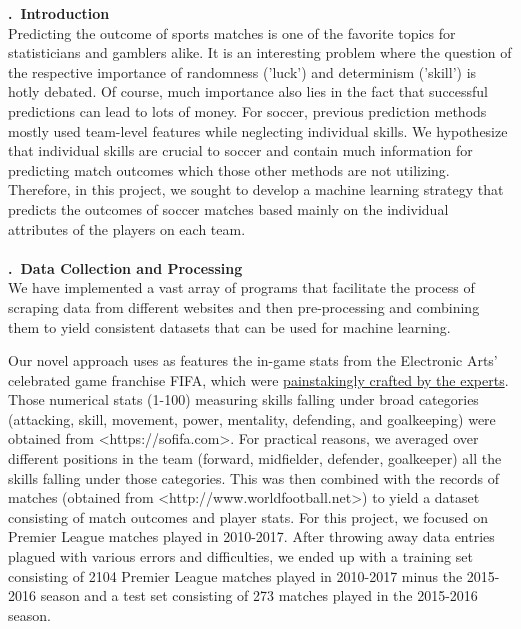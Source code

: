 \documentclass[a4paper,11pt,table]{article}
\renewcommand{\section}[1]{\stepcounter{section}\noindent\textbf{\arabic{section}.~#1}\\}
\begin{document}
\section{Introduction}

Predicting the outcome of sports matches is one of the favorite topics for statisticians and gamblers alike. It is an interesting problem where the question of the respective importance of randomness ('luck') and determinism ('skill') is hotly debated. Of course, much importance also lies in the fact that successful predictions can lead to lots of money. For soccer, previous prediction methods mostly used team-level features while neglecting individual skills. We hypothesize that individual skills are crucial to soccer and contain much information for predicting match outcomes which those other methods are not utilizing. Therefore, in this project, we sought to develop a machine learning strategy that predicts the outcomes of soccer matches based mainly on the individual attributes of the players on each team. \\
~\\
\section{Data Collection and Processing}
We have implemented a vast array of programs that facilitate the process of scraping data from different websites and then pre-processing and combining them to yield consistent datasets that can be used for machine learning.

Our novel approach uses as features the in-game stats from the Electronic Arts' celebrated game franchise FIFA, which were \href{http://www.espnfc.us/blog/espn-fc-united-blog/68/post/2959703/fifa-17-player-ratings-system-blends-advanced-stats-and-subjective-scouting}{painstakingly crafted by the experts}. Those numerical stats (1-100) measuring skills falling under broad categories (attacking, skill, movement, power, mentality, defending, and goalkeeping) were obtained from <https://sofifa.com>. For practical reasons, we averaged over different positions in the team (forward, midfielder, defender, goalkeeper) all the skills falling under those categories. This was then combined with the records of matches (obtained from <http://www.worldfootball.net>) to yield a dataset consisting of match outcomes and player stats. For this project, we focused on Premier League matches played in 2010-2017. After throwing away data entries plagued with various errors and difficulties, we ended up with a training set consisting of 2104 Premier League matches played in 2010-2017 minus the 2015-2016 season and a test set consisting of 273 matches played in the 2015-2016 season.
\end{document}
